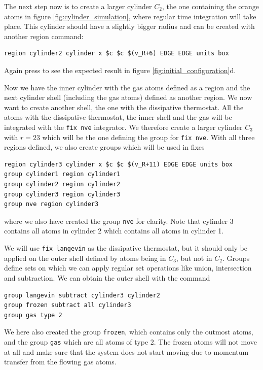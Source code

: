 \documentclass[12pt,a4paper,final]{iopart}
\newcommand{\code}[1]{\colorbox{light-gray}{\color{RawSienna}\texttt{#1}}}
\begin{document}
The next step now is to create a larger cylinder $C_2$, the one containing the orange atoms in
figure \ref{fig:cylinder_simulation}, where regular time integration will take place.
This cylinder should have a slightly bigger radius and can be created with another region command:
\begin{lstlisting}
region cylinder2 cylinder x $c $c $(v_R+6) EDGE EDGE units box
\end{lstlisting}
Again press  to see the expected result in figure \ref{fig:initial_configuration}d.

Now we have the inner cylinder with the gas atoms defined as a region and the next cylinder shell (including the gas atoms) defined as another region.
We now want to create another shell, the one with the dissipative thermostat.
All the atoms with the dissipative thermostat, the inner shell and the gas will be integrated with the \code{fix nve} integrator.
We therefore create a larger cylinder $C_3$ with $r=23$ which will be the one defining the group for \code{fix nve}.
With all three regions defined, we also create groups which will be used in fixes
\begin{lstlisting}
region cylinder3 cylinder x $c $c $(v_R+11) EDGE EDGE units box
group cylinder1 region cylinder1
group cylinder2 region cylinder2
group cylinder3 region cylinder3
group nve region cylinder3
\end{lstlisting}
where we also have created the group \code{nve} for clarity.
Note that cylinder 3 contains all atoms in cylinder 2 which contains all atoms in cylinder 1.

We will use \code{fix langevin}\cite{schneider1978molecular} as the dissipative thermostat,
but it should only be applied on the outer shell defined by atoms being in $C_3$, but not in $C_2$.
Groups define sets on which we can apply regular set operations like union, intersection and subtraction.
We can obtain the outer shell with the command

\begin{lstlisting}
group langevin subtract cylinder3 cylinder2
group frozen subtract all cylinder3
group gas type 2
\end{lstlisting}

We here also created the group \code{frozen}, which contains only the outmost atoms,
and the group \code{gas} which are all atoms of type 2.
The frozen atoms will not move at all and make sure that the system does not start 
moving due to momentum transfer from the flowing gas atoms.
\end{document}
